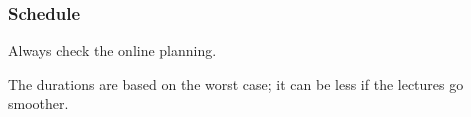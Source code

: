 \documentclass{beamer}
\begin{document}
\begin{frame}
	\frametitle{Schedule}
	
	Always check the online planning. 
	
	The durations are based on the worst case; it can be less if the lectures go smoother.
	
%		
%		
%		
%		
%		
%		
%		
%		
%		
%		
%		
%		 
%		 
%		 
%		
%	
\end{frame}
\end{document}
